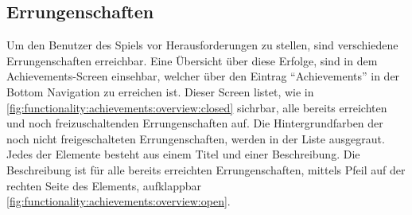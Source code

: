 \documentclass[a4paper]{article}
\begin{document}
\subsection{Errungenschaften}
\label{subsec:functionality:achievements}
Um den Benutzer des Spiels vor Herausforderungen zu stellen, sind verschiedene Errungenschaften erreichbar. Eine Übersicht über diese Erfolge, sind in dem Achievements-Screen einsehbar, welcher über den Eintrag "`Achievements"' in der Bottom Navigation zu erreichen ist. Dieser Screen listet, wie in \autoref{fig:functionality:achievements:overview:closed} sichrbar, alle bereits erreichten und noch freizuschaltenden Errungenschaften auf. Die Hintergrundfarben der noch nicht freigeschalteten Errungenschaften, werden in der Liste ausgegraut. Jedes der Elemente besteht aus einem Titel und einer Beschreibung. Die Beschreibung ist für alle bereits erreichten Errungenschaften, mittels Pfeil auf der rechten Seite des Elements, aufklappbar \autoref{fig:functionality:achievements:overview:open}.
\end{document}
